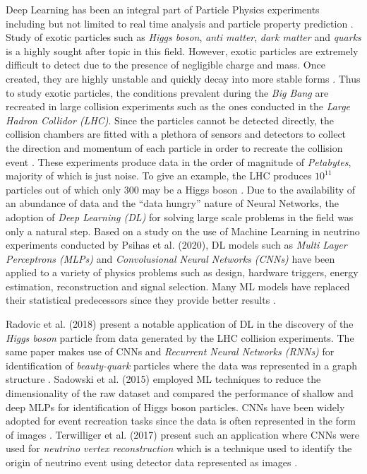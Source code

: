 Deep Learning has been an integral part of Particle Physics
experiments \cite{radovic2018machine, sadowski2015deep, de2019machine,
  psihas2020review, terwilliger2017vertex} including but not limited
to real time analysis and particle property prediction
\cite{radovic2018machine}. Study of exotic particles such as
\emph{Higgs boson}, \emph{anti matter}, \emph{dark matter} and
\emph{quarks} is a highly sought after topic in this field. However,
exotic particles are extremely difficult to detect due to the presence
of negligible charge and mass. Once created, they are
highly unstable and quickly decay into more stable forms
\cite{sadowski2015deep}. Thus to study exotic particles, the
conditions prevalent during the \emph{Big Bang} are recreated in large
collision experiments such as the ones conducted in the \emph{Large
Hadron Collidor (LHC)}. Since the particles cannot be detected
directly, the collision chambers are fitted with a plethora of sensors
and detectors to collect the direction and momentum of each particle
in order to recreate the collision event \cite{sadowski2015deep}.
These experiments produce data in the order of magnitude of
\emph{Petabytes}, majority of which is just noise. To give an example,
the LHC produces $10^{11}$ particles out of which only 300 may be a
Higgs boson \cite{sadowski2015deep}. Due to the availability of an
abundance of data and the ``data hungry'' nature of Neural Networks,
the adoption of \emph{Deep Learning (DL)} for solving large scale
problems in the field was only a natural step. Based on a study on the
use of Machine Learning in neutrino experiments conducted by Psihas et
al. (2020), DL models such as \emph{Multi Layer Perceptrons (MLPs)} and
\emph{Convolusional Neural Networks (CNNs)} have been applied to a
variety of physics problems such as design, hardware triggers, energy
estimation, reconstruction and signal selection. Many ML models have
replaced their statistical predecessors since they provide better
results \cite{psihas2020review}.

Radovic et al. (2018) present a notable application of DL in the
discovery of the \emph{Higgs boson} particle from data generated by
the LHC collision experiments. The same paper makes use of CNNs and
\emph{Recurrent Neural Networks (RNNs)} for identification of
\emph{beauty-quark} particles where the data was represented in a
graph structure \cite{radovic2018machine}. Sadowski et al. (2015)
employed ML techniques to reduce the dimensionality of the raw dataset
and compared the performance of shallow and deep MLPs for
identification of Higgs boson particles. CNNs have been widely adopted
for event recreation tasks since the data is often represented in the
form of images \cite{sadowski2015deep}. Terwilliger et al. (2017)
present such an application where CNNs were used for \emph{neutrino
vertex reconstruction} which is a technique used to identify the
origin of neutrino event using detector data represented as images
\cite{terwilliger2017vertex}.

